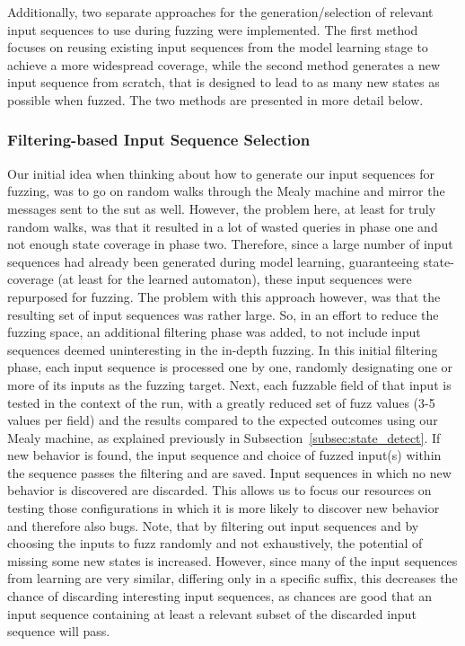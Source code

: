 Additionally, two separate approaches for the generation/selection of relevant input sequences to use during fuzzing were implemented. The first method focuses on reusing existing input sequences from the model learning stage to achieve a more widespread coverage, while the second method generates a new input sequence from scratch, that is designed to lead to as many new states as possible when fuzzed. The two methods are presented in more detail below.

\subsubsection{Filtering-based Input Sequence Selection} \label{subsubsec:fuzz_filtering}
Our initial idea when thinking about how to generate our input sequences for fuzzing, was to go on random walks through the Mealy machine and mirror the messages sent to the \ac{sut} as well. However, the problem here, at least for truly random walks, was that it resulted in a lot of wasted queries in phase one and not enough state coverage in phase two. Therefore, since a large number of input sequences had already been generated during model learning, guaranteeing state-coverage (at least for the learned automaton), these input sequences were repurposed for fuzzing. The problem with this approach however, was that the resulting set of input sequences was rather large. So, in an effort to reduce the fuzzing space, an additional filtering phase was added, to not include input sequences deemed uninteresting in the in-depth fuzzing. In this initial filtering phase, each input sequence is processed one by one, randomly designating one or more of its inputs as the fuzzing target. Next, each fuzzable field of that input is tested in the context of the run, with a greatly reduced set of fuzz values (3-5 values per field) and the results compared to the expected outcomes using our Mealy machine, as explained previously in Subsection~\ref{subsec:state_detect}. If new behavior is found, the input sequence and choice of fuzzed input(s) within the sequence passes the filtering and are saved. Input sequences in which no new behavior is discovered are discarded. This allows us to focus our resources on testing those configurations in which it is more likely to discover new behavior and therefore also bugs.
Note, that by filtering out input sequences and by choosing the inputs to fuzz randomly and not exhaustively, the potential of missing some new states is increased. However, since many of the input sequences from learning are very similar, differing only in a specific suffix, this decreases the chance of discarding interesting input sequences, as chances are good that an input sequence containing at least a relevant subset of the discarded input sequence will pass.

